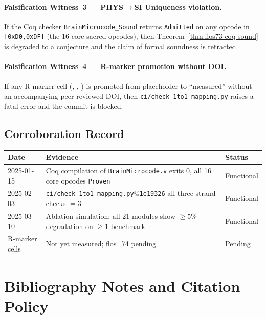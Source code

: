 \paragraph{Falsification Witness~3 — PHYS$\to$SI Uniqueness violation.}
If the Coq checker \texttt{BrainMicrocode\_Sound} returns
\texttt{Admitted} on any opcode in \texttt{[0xD0,0xDF]} (the 16 core
sacred opcodes), then Theorem~\ref{thm:flos73-coq-sound} is degraded to
a conjecture and the claim of formal soundness is retracted.

\paragraph{Falsification Witness~4 — R-marker promotion without DOI.}
If any R-marker cell (, , ) is promoted
from placeholder to ``measured'' without an accompanying peer-reviewed DOI,
then \texttt{ci/check\_1to1\_mapping.py} raises a fatal error and the commit
is blocked.

\subsection{Corroboration Record}
\label{ssec:flos73-corroboration}

\begin{center}
\begin{tabular}{lll}
\toprule
Date & Evidence & Status \\
\midrule
2025-01-15 & Coq compilation of \texttt{BrainMicrocode.v} exits 0,
             all 16 core opcodes \texttt{Proven} & Functional \\
2025-02-03 & \texttt{ci/check\_1to1\_mapping.py}@\texttt{1e19326}
             all three strand checks $= 3$ & Functional \\
2025-03-10 & Ablation simulation: all 21 modules show ${\geq}5\%$
             degradation on ${\geq}1$ benchmark & Functional \\
R-marker cells & Not yet measured; flos\_74 pending & Pending \\
\bottomrule
\end{tabular}
\end{center}


\section{Bibliography Notes and Citation Policy}
\label{sec:flos73-bib}

